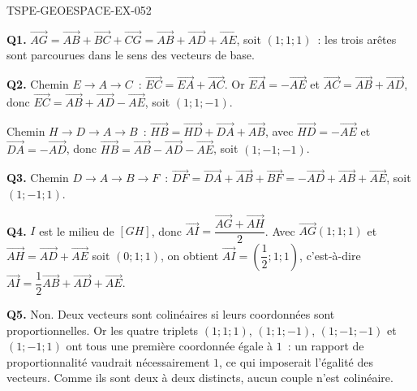 \begin{corrige}{TSPE-GEOESPACE-EX-052}

\textbf{Q1.} $\vec{AG}=\vec{AB}+\vec{BC}+\vec{CG}=\vec{AB}+\vec{AD}+\vec{AE}$,
soit $(1;1;1)$~: les trois arêtes sont parcourues dans le sens des vecteurs de
base.

\textbf{Q2.} Chemin $E\to A\to C$~: $\vec{EC}=\vec{EA}+\vec{AC}$. Or
$\vec{EA}=-\vec{AE}$ et $\vec{AC}=\vec{AB}+\vec{AD}$, donc
$\vec{EC}=\vec{AB}+\vec{AD}-\vec{AE}$, soit $(1;1;-1)$.

Chemin $H\to D\to A\to B$~: $\vec{HB}=\vec{HD}+\vec{DA}+\vec{AB}$, avec
$\vec{HD}=-\vec{AE}$ et $\vec{DA}=-\vec{AD}$, donc
$\vec{HB}=\vec{AB}-\vec{AD}-\vec{AE}$, soit $(1;-1;-1)$.

\textbf{Q3.} Chemin $D\to A\to B\to F$~:
$\vec{DF}=\vec{DA}+\vec{AB}+\vec{BF}=-\vec{AD}+\vec{AB}+\vec{AE}$, soit
$(1;-1;1)$.

\textbf{Q4.} $I$ est le milieu de $[GH]$, donc
$\vec{AI}=\dfrac{\vec{AG}+\vec{AH}}{2}$. Avec $\vec{AG}(1;1;1)$ et
$\vec{AH}=\vec{AD}+\vec{AE}$ soit $(0;1;1)$, on obtient
$\vec{AI}=\left(\dfrac12;1;1\right)$, c'est-à-dire
$\vec{AI}=\dfrac12\vec{AB}+\vec{AD}+\vec{AE}$.

\textbf{Q5.} Non. Deux vecteurs sont colinéaires si leurs coordonnées sont
proportionnelles. Or les quatre triplets $(1;1;1)$, $(1;1;-1)$, $(1;-1;-1)$ et
$(1;-1;1)$ ont tous une première coordonnée égale à $1$~: un rapport de
proportionnalité vaudrait nécessairement $1$, ce qui imposerait l'égalité des
vecteurs. Comme ils sont deux à deux distincts, aucun couple n'est colinéaire.

\end{corrige}

%
%
%
